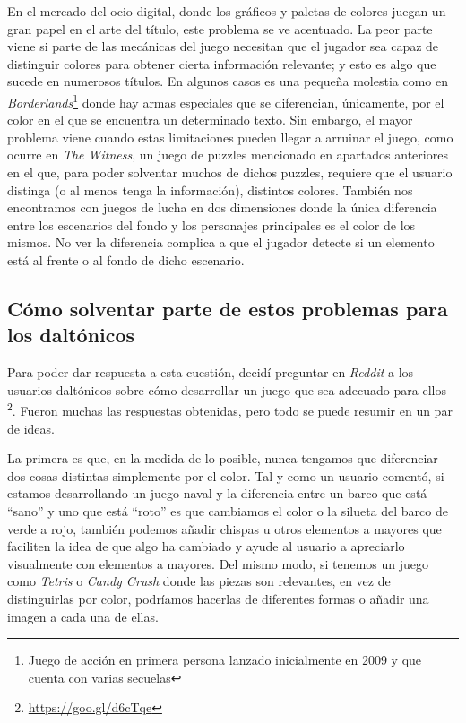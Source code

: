 En el mercado del ocio digital, donde los gráficos y paletas de colores juegan un gran papel en el arte del título, este problema se ve acentuado. La peor parte viene si parte de las mecánicas del juego necesitan que el jugador sea capaz de distinguir colores para obtener cierta información relevante; y esto es algo que sucede en numerosos títulos. En algunos casos es una pequeña molestia como en \textit{Borderlands}\footnote{Juego de acción en primera persona lanzado inicialmente en 2009 y que cuenta con varias secuelas} donde hay armas especiales que se diferencian, únicamente, por el color en el que se encuentra un determinado texto. Sin embargo, el mayor problema viene cuando estas limitaciones pueden llegar a arruinar el juego, como ocurre en \textit{The Witness}, un juego de puzzles mencionado en apartados anteriores en el que, para poder solventar muchos de dichos puzzles, requiere que el usuario distinga (o al menos tenga la información), distintos colores. 
También nos encontramos con juegos de lucha en dos dimensiones donde la única diferencia entre los escenarios del fondo y los personajes principales es el color de los mismos. No ver la diferencia complica a que el jugador detecte si un elemento está al frente o al fondo de dicho escenario.

\subsection{Cómo solventar parte de estos problemas para los daltónicos}
\label{sec:daltonicossolventar}

Para poder dar respuesta a esta cuestión, decidí preguntar en \textit{Reddit} a los usuarios daltónicos sobre cómo desarrollar un juego que sea adecuado para ellos \footnote{\url{https://goo.gl/d6cTqe}}. Fueron muchas las respuestas obtenidas, pero todo se puede resumir en un par de ideas.

La primera es que, en la medida de lo posible, nunca tengamos que diferenciar dos cosas distintas simplemente por el color. Tal y como un usuario comentó, si estamos desarrollando un juego naval y la diferencia entre un barco que está ``sano'' y uno que está ``roto'' es que cambiamos el color o la silueta del barco de verde a rojo, también podemos añadir chispas u otros elementos a mayores que faciliten la idea de que algo ha cambiado y ayude al usuario a apreciarlo visualmente con elementos a mayores. Del mismo modo, si tenemos un juego como \textit{Tetris} o \textit{Candy Crush} donde las piezas son relevantes, en vez de distinguirlas por color, podríamos hacerlas de diferentes formas o añadir una imagen a cada una de ellas.


